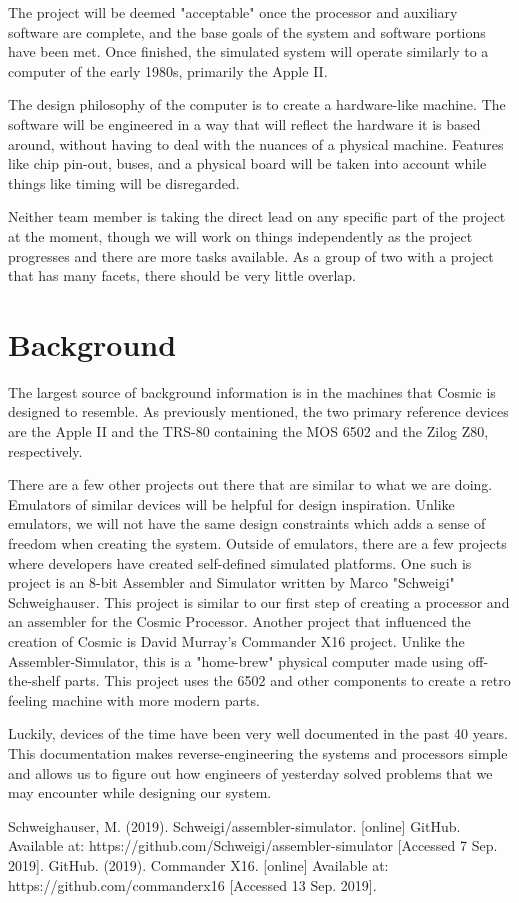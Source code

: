 \documentclass[conference]{IEEEtran}
\begin{document}
	The project will be deemed "acceptable" once the processor and auxiliary software are complete, and the base goals of the system and software portions have been met. Once finished, the simulated system will operate similarly to a computer of the early 1980s, primarily the Apple II.

	The design philosophy of the computer is to create a hardware-like machine. The software will be engineered in a way that will reflect the hardware it is based around, without having to deal with the nuances of a physical machine. Features like chip pin-out, buses, and a physical board will be taken into account while things like timing will be disregarded. 

	Neither team member is taking the direct lead on any specific part of the project at the moment, though we will work on things independently as the project progresses and there are more tasks available. As a group of two with a project that has many facets, there should be very little overlap. 

\section{Background}

	The largest source of background information is in the machines that Cosmic is designed to resemble. As previously mentioned, the two primary reference devices are the Apple II and the TRS-80 containing the MOS 6502 and the Zilog Z80, respectively.
	
	There are a few other projects out there that are similar to what we are doing. Emulators of similar devices will be helpful for design inspiration. Unlike emulators, we will not have the same design constraints which adds a sense of freedom when creating the system. Outside of emulators, there are a few projects where developers have created self-defined simulated platforms. One such is project is an 8-bit Assembler and Simulator written by Marco "Schweigi" Schweighauser\cite{b1}. This project is similar to our first step of creating a processor and an assembler for the Cosmic Processor. Another project that influenced the creation of Cosmic is David Murray's Commander X16 project\cite{b2}. Unlike the Assembler-Simulator, this is a "home-brew" physical computer made using off-the-shelf parts. This project uses the 6502 and other components to create a retro feeling machine with more modern parts. 

    Luckily, devices of the time have been very well documented in the past 40 years. This documentation makes reverse-engineering the systems and processors simple and allows us to figure out how engineers of yesterday solved problems that we may encounter while designing our system. 


\begin{thebibliography}{00}
 Schweighauser, M. (2019). Schweigi/assembler-simulator. [online] GitHub. Available at: https://github.com/Schweigi/assembler-simulator [Accessed 7 Sep. 2019].
GitHub. (2019). Commander X16. [online] Available at: https://github.com/commanderx16 [Accessed 13 Sep. 2019].

\end{thebibliography}
\end{document}
